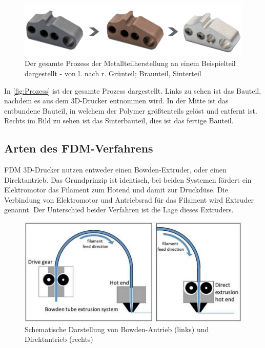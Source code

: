 \begin{figure}[h]
	\centering
	\includegraphics[width=0.8\linewidth]{bilder/img_gruenteil-braunteil-sinterteil.png}
        \caption[Der gesamte Prozess der Metallteilherstellung an einem Beispielteil dargestellt] {Der gesamte Prozess der Metallteilherstellung an einem Beispielteil dargestellt - von l. nach r. Grünteil; Braunteil, Sinterteil \autocite{junghans}}
	\label{fig:Prozess}
\end{figure}

In \autoref{fig:Prozess} ist der gesamte Prozess dargestellt. Links zu sehen ist das Bauteil, nachdem es aus dem 3D-Drucker entnommen wird. In der Mitte ist das entbundene Bauteil, in welchem der Polymer größtenteils gelöst und entfernt ist. Rechts im Bild zu sehen ist das Sinterbauteil, dies ist das fertige Bauteil.

\subsection{Arten des FDM-Verfahrens}
\label{sec:ArtenFDM}

FDM 3D-Drucker nutzen entweder einen Bowden-Extruder, oder einen Direktantrieb. Das Grundprinzip ist identisch, bei beiden Systemen fördert ein Elektromotor das Filament zum Hotend und damit zur Druckdüse. Die Verbindung von Elektromotor und Antriebsrad für das Filament wird Extruder genannt. Der Unterschied beider Verfahren ist die Lage dieses Extruders.

\begin{figure}[h]
	\centering
	\includegraphics[width=0.8\linewidth]{bilder/img_BowdenvsDrirect.png}
        \caption[Schematische Darstellung von Bowden-Antrieb (links) und Direktantrieb (rechts)] {Schematische Darstellung von Bowden-Antrieb (links) und Direktantrieb (rechts) \autocite{facfox}}
	\label{fig:Verfahren}
\end{figure}


